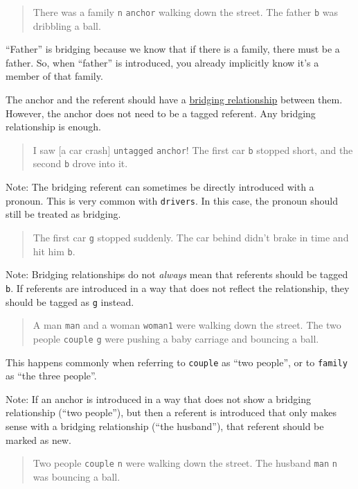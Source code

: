 \documentclass[
]{book}
\begin{document}
\begin{quote}
There was a family \texttt{n} \texttt{anchor} walking down the street.
The father \texttt{b} was dribbling a ball.
\end{quote}

``Father'' is bridging because we know that if there is a family, there must be a father.
So, when ``father'' is introduced, you already implicitly know it's a member of that family.

The anchor and the referent should have a
\protect\hyperlink{bridgingux5cux2520relationship}{bridging relationship} between them.
However, the anchor does not need to be a tagged referent.
Any bridging relationship is enough.

\begin{quote}
I saw {[}a car crash{]} \texttt{untagged} \texttt{anchor}!
The first car \texttt{b} stopped short, and the second \texttt{b} drove into it.
\end{quote}

Note:
The bridging referent can sometimes be directly introduced with a pronoun.
This is very common with \texttt{drivers}.
In this case, the pronoun should still be treated as bridging.

\begin{quote}
The first car \texttt{g} stopped suddenly.
The car behind didn't brake in time and hit him \texttt{b}.
\end{quote}

Note:
Bridging relationships do not \emph{always} mean that
referents should be tagged \texttt{b}.
If referents are introduced
in a way that does not reflect the relationship,
they should be tagged as \texttt{g} instead.

\begin{quote}
A man \texttt{man} and a woman \texttt{woman1} were walking down the street.
The two people \texttt{couple} \texttt{g}
were pushing a baby carriage and bouncing a ball.
\end{quote}

This happens commonly when referring to \texttt{couple} as ``two people'',
or to \texttt{family} as ``the three people''.

Note:
If an anchor is introduced
in a way that does not show a bridging relationship (``two people''),
but then a referent is introduced
that only makes sense with a bridging relationship (``the husband''),
that referent should be marked as new.

\begin{quote}
Two people \texttt{couple} \texttt{n} were walking down the street.
The husband \texttt{man} \texttt{n} was bouncing a ball.
\end{quote}
\end{document}

